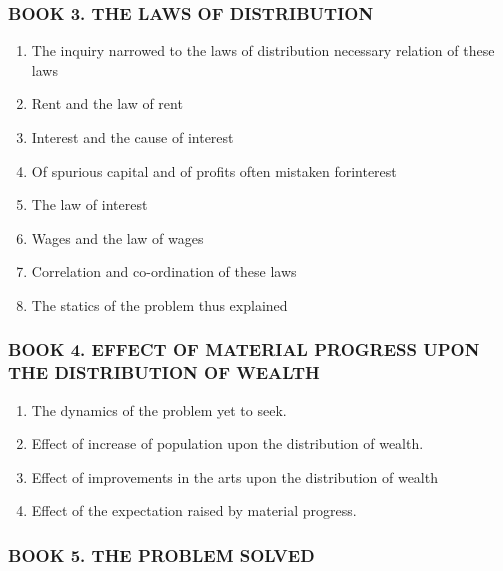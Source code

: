 \hypertarget{book-3.-the-laws-of-distribution}{%
\subsubsection{BOOK 3. THE LAWS OF
DISTRIBUTION}\label{book-3.-the-laws-of-distribution}}

\begin{enumerate}
\def\labelenumi{\arabic{enumi}.}
\tightlist
\item
  The inquiry narrowed to the laws of distribution necessary relation of
  these laws
\item
  Rent and the law of rent
\item
  Interest and the cause of interest
\item
  Of spurious capital and of profits often mistaken forinterest
\item
  The law of interest
\item
  Wages and the law of wages
\item
  Correlation and co-ordination of these laws
\item
  The statics of the problem thus explained
\end{enumerate}

\hypertarget{book-4.-effect-of-material-progress-upon-the-distribution-of-wealth}{%
\subsubsection{BOOK 4. EFFECT OF MATERIAL PROGRESS UPON THE DISTRIBUTION
OF
WEALTH}\label{book-4.-effect-of-material-progress-upon-the-distribution-of-wealth}}

\begin{enumerate}
\def\labelenumi{\arabic{enumi}.}
\tightlist
\item
  The dynamics of the problem yet to seek.
\item
  Effect of increase of population upon the distribution of wealth.
\item
  Effect of improvements in the arts upon the distribution of wealth
\item
  Effect of the expectation raised by material progress.
\end{enumerate}

\hypertarget{book-5.-the-problem-solved}{%
\subsubsection{BOOK 5. THE PROBLEM
SOLVED}\label{book-5.-the-problem-solved}}

